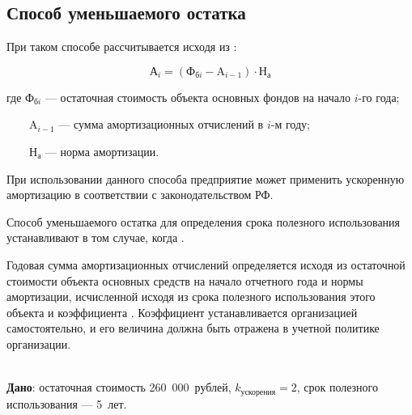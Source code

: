 \subsection{Способ уменьшаемого остатка}

\begin{tcolorbox}

При таком способе  рассчитывается исходя из :

\begin{equation}
    \text{А}_{i} = (\text{Ф}_{\text{б}i} - \text{A}_{i-1}) \cdot \text{Н}_{\text{а}}
\end{equation}

где $\text{Ф}_{\text{б}i}$ --- остаточная стоимость объекта основных фондов на начало $i$-го года;

~~~~$\text{A}_{i-1}$ --- сумма амортизационных отчислений в $i$-м году;

~~~~$\text{Н}_{\text{а}}$ --- норма амортизации.
\end{tcolorbox}

При использовании данного способа предприятие может применить ускоренную
амортизацию в соответствии с законодательством РФ.

Способ уменьшаемого остатка для определения срока полезного использования
устанавливают в том случае, когда .

Годовая сумма амортизационных отчислений определяется исходя из остаточной
стоимости объекта основных средств на начало отчетного года и нормы амортизации,
исчисленной исходя из срока полезного использования этого объекта и коэффициента
. Коэффициент устанавливается
организацией самостоятельно, и его величина должна быть отражена в учетной
политике организации.

\begin{example}
    \normalfont
    ~\\
    \textbf{Дано}: остаточная стоимость 260~000~рублей,
    \mbox{$k_{\text{ускорения}}=2$}, срок полезного использования --- 5~лет.
\end{example}

